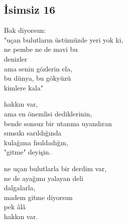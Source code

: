 \subsection{İsimsiz 16}

Bak diyorsun: \\
"uçan bulutların üstümüzde yeri yok ki, \\
	ne pembe ne de mavi bu \\
	denizler \\
		ama senin gözlerin ela, \\
		bu dünya, bu gökyüzü \\
			kimlere kala"

\noindent\newline
hakkın var, \\
ama en önemlisi dediklerinin, \\
	bende sonsuz bir utanma uyandıran \\
		sımsıkı sarıldığında \\
			kulağıma fısıldadığın, \\
				"gitme" deyişin.

\noindent\newline
ne uçan bulutlarla bir derdim var, \\
ne de ayağımı yalayan deli \\
dalgalarla, \\
madem gitme diyorsun \\
	pek âlâ \\
		hakkın var.